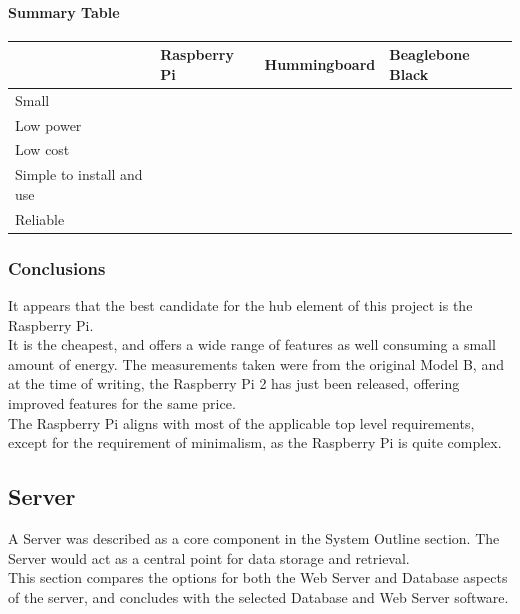 \documentclass[preprint,12pt,3p]{elsarticle}
\newcommand{\checkmark}{\ding{51}}%
\newcommand{\xmark}{\ding{55}}%
\begin{document}
\paragraph{Summary Table}
\begin{tabular}{| l | l | l | l |}
    \hline
          & Raspberry Pi & Hummingboard & Beaglebone Black \\ \hline
    Small & \checkmark & \checkmark & \checkmark\\ \hline
    Low power & \checkmark & \checkmark & \checkmark\\ \hline
    Low cost & \checkmark & \xmark & \xmark\\ \hline
    Simple to install and use & \checkmark & \checkmark & \checkmark\\ \hline
    Reliable & \checkmark & \checkmark & \checkmark\\ \hline
\end{tabular}

\subsubsection{Conclusions}
It appears that the best candidate for the hub element of this project is the Raspberry Pi.\\
It is the cheapest, and offers a wide range of features as well consuming a small amount of energy. The measurements taken were from the original Model B, and at the time of writing, the Raspberry Pi 2 has just been released, offering improved features for the same price.\\
The Raspberry Pi aligns with most of the applicable top level requirements, except for the requirement of minimalism, as the Raspberry Pi is quite complex.

\clearpage
\subsection{Server}
A Server was described as a core component in the System Outline section. The Server would act as a central point for data storage and retrieval.\\
This section compares the options for both the Web Server and Database aspects of the server, and concludes with the selected Database and Web Server software.
\end{document}
